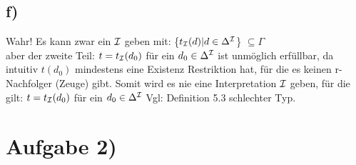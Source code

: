\documentclass[12pt]{article}
\begin{document}
\subsection*{f)}
Wahr!  Es kann zwar ein $\mathcal{I}$ geben mit: \{$t_{\mathcal{I}}(d) | d \in \Delta^{\mathcal{I}} $\}  $\subseteq \Gamma$\\
aber der zweite Teil: $t = t_{\mathcal{I}}(d_0)$ für ein $d_0 \in \Delta^{\mathcal{I}} $ ist unmöglich erfüllbar, da intuitiv $t(d_0)$ mindestens eine Existenz Restriktion hat, für die es keinen r-Nachfolger (Zeuge) gibt. Somit wird es nie eine Interpretation $\mathcal{I}$ geben, für die gilt:  $t = t_{\mathcal{I}}(d_0)$ für ein $d_0 \in \Delta^{\mathcal{I}} $  Vgl: Definition 5.3 schlechter Typ.


\section*{Aufgabe 2)}
\end{document}
